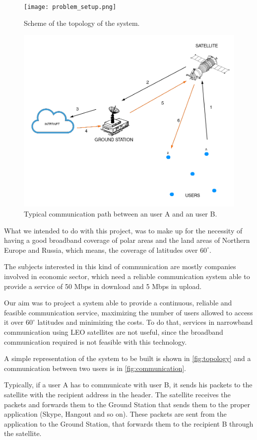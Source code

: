 \begin{figure}
	\centering
	\begin{minipage}{0.37\textwidth}
		\texttt{[image: problem\_setup.png]}
		\caption{Scheme of the topology of the system.}
		\label{fig:topology}
	\end{minipage}\hspace{0.5cm}
	\begin{minipage}{0.45\textwidth}
		\includegraphics[width=\textwidth]{figures/System_topology_noBG.png}
		\caption{Typical communication path between an user A and an user B.}
		\label{fig:communication}
	\end{minipage}
\end{figure}

What we intended to do with this project, was to make up for the necessity of having a good broadband coverage of polar areas and the land areas of Northern Europe and Russia, which means, the coverage of latitudes over $60^\circ$.

The subjects interested in this kind of communication are mostly companies involved in economic sector, which need a reliable communication system able to provide a service of 50 Mbps in download and 5 Mbps in upload.

Our aim was to project a system able to provide a continuous, reliable and feasible communication service, maximizing the number of users allowed to access it over $60^\circ$ latitudes and minimizing the costs. To do that, services in narrowband communication using LEO satellites are not useful, since the broadband communication required is not feasible with this technology.

A simple representation of the system to be built is shown in \autoref{fig:topology} and a communication between two users is in \autoref{fig:communication}.

Typically, if a user A has to communicate with user B, it sends his packets to the satellite with the recipient address in the header. The satellite receives the packets and forwards them to the Ground Station that sends them to the proper application (Skype, Hangout and so on). These packets are sent from the application to the Ground Station, that forwards them to the recipient B through the satellite.
